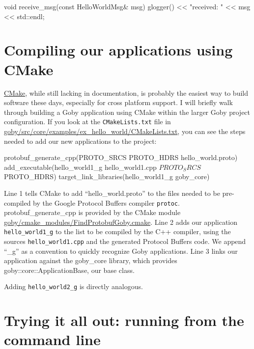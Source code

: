 \documentclass[11pt, letterpaper, oneside]{memoir}
\begin{document}
\begin{boxedverbatim}
void receive_msg(const HelloWorldMsg& msg)
{
   glogger() << "received: " << msg << std::endl;
}
\end{boxedverbatim}
\resetbvlinenumber

\section{Compiling our applications using CMake}

\href{http://www.cmake.org/}{CMake}, while still lacking in documentation, is probably the easiest way to build software these days, especially for cross platform support. I will briefly walk through building a Goby application using CMake within the larger Goby project configuration. If you look at the \verb|CMakeLists.txt| file in \href{http://bazaar.launchpad.net/~goby-dev/goby/trunk/annotate/head:/src/core/examples/ex1_hello_world/CMakeLists.txt}{goby/src/core/examples/ex\_hello\_world/CMakeLists.txt}, you can see the steps needed to add our new applications to the project:

\begin{boxedverbatim}
protobuf_generate_cpp(PROTO_SRCS PROTO_HDRS hello_world.proto)
add_executable(hello_world1_g hello_world1.cpp ${PROTO_SRCS} ${PROTO_HDRS})
target_link_libraries(hello_world1_g goby_core)
\end{boxedverbatim}
\resetbvlinenumber

Line 1 tells CMake to add ``hello\_world.proto'' to the files needed to be pre-compiled by the Google Protocol Buffers compiler \verb|protoc|. protobuf\_generate\_cpp is provided by the CMake module \href{http://bazaar.launchpad.net/~goby-dev/goby/trunk/annotate/head:/cmake_modules/FindProtobufGoby.cmake}{goby/cmake\_modules/FindProtobufGoby.cmake}. Line 2 adds our application \verb|hello_world1_g| to the list to be compiled by the C++ compiler, using the sources \verb|hello_world1.cpp| and the generated Protocol Buffers code. We append ``\_g'' as a convention to quickly recognize Goby applications. Line 3 links our application against the goby\_core library, which provides goby::core::ApplicationBase, our base class.

Adding \verb|hello_world2_g| is directly analogous.

\section{Trying it all out: running from the command line}
\end{document}
